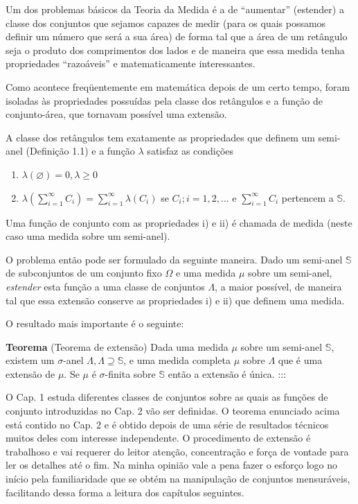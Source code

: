 \documentclass[
]{book}
\begin{document}
Um dos problemas básicos da Teoria da Medida é a de ``aumentar'' (estender) a classe dos conjuntos que sejamos capazes de medir (para os quais possamos definir um número que será a sua área) de forma tal que a área de um retângulo seja o produto dos comprimentos dos lados e de maneira que essa medida tenha propriedades ``razoáveis'' e matematicamente interessantes.

Como acontece freqüentemente em matemática depois de um certo tempo, foram isoladas às propriedades possuídas pela classe dos retângulos e a função de conjunto-área, que tornavam possível uma extensão.

A classe dos retângulos tem exatamente as propriedades que definem um semi-anel (Definição 1.1) e a função \(\lambda\) satisfaz as condições

\begin{enumerate}
\def\labelenumi{\roman{enumi})}
\item
  \(\lambda(\varnothing) = 0, \lambda \ge 0\)
\item
  \(\lambda\left(\sum\limits_{i=1}^\infty C_i\right) = \sum\limits_{i=1}^\infty \lambda(C_i)\) se \(C_i; i=1, 2, \dots\) e \(\sum\limits_{i=1}^\infty C_i\) pertencem a \(\mathbb{S}\).
\end{enumerate}

Uma função de conjunto com as propriedades i) e ii) é chamada de medida (neste caso uma medida sobre um semi-anel).

O problema então pode ser formulado da seguinte maneira. Dado um semi-anel \(\mathbb{S}\) de subconjuntos de um conjunto fixo \(\Omega\) e uma medida \(\mu\) sobre um semi-anel, \emph{estender} esta função a uma classe de conjuntos \(\Lambda\), a maior possível, de maneira tal que essa extensão conserve as propriedades i) e ii) que definem uma medida.

O resultado mais importante é o seguinte:

\textbf{Teorema} (Teorema de extensão) Dada uma medida \(\mu\) sobre um semi-anel \(\mathbb{S}\), existem um \(\sigma\)-anel \(\Lambda, \Lambda \supseteq \mathbb{S}\), e uma medida completa \(\mu\) sobre \(\Lambda\) que é uma extensão de \(\mu\). Se \(\mu\) é \(\sigma\)-finita sobre \(\mathbb{S}\) então a extensão é única.
:::

O Cap. 1 estuda diferentes classes de conjuntos sobre as quais as funções de conjunto introduzidas no Cap. 2 vão ser definidas. O teorema enunciado acima está contido no Cap. 2 e é obtido depois de uma série de resultados técnicos muitos deles com interesse independente. O procedimento de extensão é trabalhoso e vai requerer do leitor atenção, concentração e força de vontade para ler os detalhes até o fim. Na minha opinião vale a pena fazer o esforço logo no início pela familiaridade que se obtém na manipulação de conjuntos mensuráveis, facilitando dessa forma a leitura dos capítulos seguintes.
\end{document}
